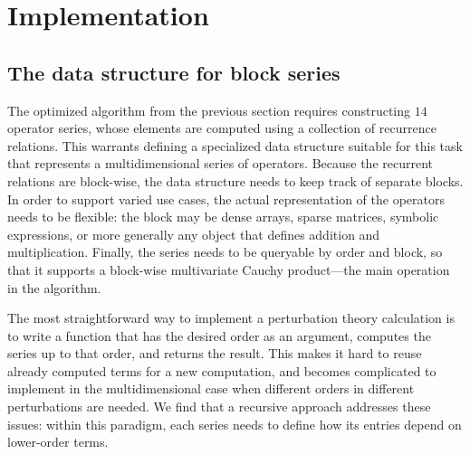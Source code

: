 \section{Implementation}
\label{sec:implementation}

\subsection{The data structure for block series}
\label{sec:BlockSeries}

The optimized algorithm from the previous section requires constructing $14$ operator series, whose elements are computed using a collection of recurrence relations.
This warrants defining a specialized data structure suitable for this task that represents a multidimensional series of operators.
Because the recurrent relations are block-wise, the data structure needs to keep track of separate blocks.
In order to support varied use cases, the actual representation of the operators needs to be flexible: the block may be dense arrays, sparse matrices, symbolic expressions, or more generally any object that defines addition and multiplication.
Finally, the series needs to be queryable by order and block, so that it supports a block-wise multivariate Cauchy product---the main operation in the algorithm.

The most straightforward way to implement a perturbation theory calculation is to write a function that has the desired order as an argument, computes the series up to that order, and returns the result.
This makes it hard to reuse already computed terms for a new computation, and becomes complicated to implement in the multidimensional case when different orders in different perturbations are needed.
We find that a recursive approach addresses these issues: within this paradigm, each series needs to define how its entries depend on lower-order terms.

